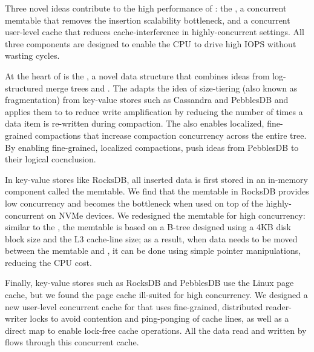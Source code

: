Three novel ideas contribute to the high performance of \sysname: the
\emph{\datastruct}, a concurrent memtable that removes the insertion
scalability bottleneck, and a concurrent user-level cache that reduces
cache-interference in highly-concurrent settings.  All three components are
designed to enable the CPU to drive high IOPS without wasting cycles.

At the heart of \sysname is the \datastruct, a novel data structure that
combines ideas from log-structured merge trees and \bets.  The \datastruct
adapts the idea of size-tiering (also known as fragmentation) from key-value
stores such as Cassandra and PebblesDB and applies them to \bets to reduce
write amplification by reducing the number of times a data item is re-written
during compaction.  The \datastruct also enables localized, fine-grained
compactions that increase compaction concurrency across the entire tree.  By
enabling fine-grained, localized compactions, \datastructs push ideas from
PebblesDB to their logical cocnclusion.

In key-value stores like RocksDB, all inserted data is first stored in an
in-memory component called the memtable. We find that the memtable in RocksDB
provides low concurrency and becomes the bottleneck when used on top of the
highly-concurrent \datastruct on NVMe devices. We redesigned the memtable for
high concurrency: similar to the \datastruct, the \sysname memtable is based on
a B-tree designed using a 4KB disk block size and the L3 cache-line size; as a
result, when data needs to be moved between the memtable and \datastruct, it
can be done using simple pointer manipulations, reducing the CPU cost.

Finally, key-value stores such as RocksDB and PebblesDB use the Linux page
cache, but we found the page cache ill-suited for high concurrency.  We
designed a new user-level concurrent cache for \sysname that uses fine-grained,
distributed reader-writer locks to avoid contention and ping-ponging of cache
lines, as well as a direct map to enable lock-free cache operations. All the
data read and written by \sysname flows through this concurrent cache.

